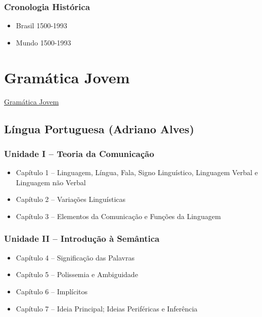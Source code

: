 \documentclass[a4paper,12pt]{article}[abntex2]
\begin{document}
\subsubsection*{Cronologia Histórica}

\begin{itemize}
\item Brasil 1500-1993
\item Mundo 1500-1993
\end{itemize}

\newpage
\section{Gramática Jovem}
\href{https://chatgpt.com/g/g-U5U26T3Vo}{Gramática Jovem}

\subsection{Língua Portuguesa (Adriano Alves)}
\subsubsection*{Unidade I – Teoria da Comunicação}
\begin{itemize}
    \item Capítulo 1 – Linguagem, Língua, Fala, Signo Linguístico, Linguagem Verbal e Linguagem não Verbal
    \item Capítulo 2 – Variações Linguísticas
    \item Capítulo 3 – Elementos da Comunicação e Funções da Linguagem
\end{itemize}

\subsubsection*{Unidade II – Introdução à Semântica}
\begin{itemize}
    \item Capítulo 4 – Significação das Palavras
    \item Capítulo 5 – Polissemia e Ambiguidade
    \item Capítulo 6 – Implícitos
    \item Capítulo 7 – Ideia Principal; Ideias Periféricas e Inferência
\end{itemize}
\end{document}
